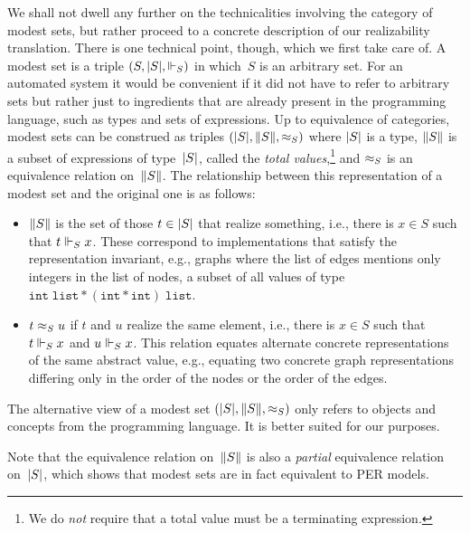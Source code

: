 We shall not dwell any further on the technicalities involving the
category of modest sets, but rather proceed to a concrete description
of our realizability translation. There is one technical point,
though, which we first take care of. A modest set is a triple $(S,
|S|, {\Vdash_S})$ in which~$S$ is an arbitrary set. For an automated
system it would be convenient if it did not have to refer to arbitrary
sets but rather just to ingredients that are already present in the
programming language, such as types and sets of expressions. Up to
equivalence of categories, modest sets can be construed as triples
$(|S|, \|S\|, {\approx_{S}})$ where $|S|$ is a type, $\|S\|$ is
a subset of expressions of type~$|S|$, called the \emph{total
  values},\footnote{We do \emph{not} require that a total value must
  be a terminating expression.} and $\approx_{S}$ is an equivalence
relation on~$\|S\|$. The relationship between this representation of
a modest set and the original one is as follows:
%
\begin{itemize}
\item $\|S\|$ is the set of those $t \in |S|$ that
  realize something, i.e., there is $x \in S$ such that $t \Vdash_S x$.
  These correspond to implementations that satisfy
  the representation invariant, e.g., graphs where the list of edges
  mentions only integers in the list of nodes, a subset of
  all values of type $\mathtt{int} \; \mathtt{list} * (\mathtt{int} *
\mathtt{int}) \; \mathtt{list}$.
\item $t \approx_{S} u$ if $t$ and $u$ realize the same element, i.e.,
  there is $x \in S$ such that $t \Vdash_S x$ and $u \Vdash_S x$.
  This relation equates alternate concrete representations of the same
  abstract value, e.g., equating two concrete graph representations differing
  only in the order of the nodes or the order of the edges.
\end{itemize}
%
The alternative view of a modest set $(|S|, \|S\|, {\approx_{S}})$
only refers to objects and concepts from the programming language. It
is better suited for our purposes.

Note that the equivalence relation on~$\|S\|$ is also a
\emph{partial} equivalence relation on~$|S|$, which shows that
modest sets are in fact equivalent to PER models.


